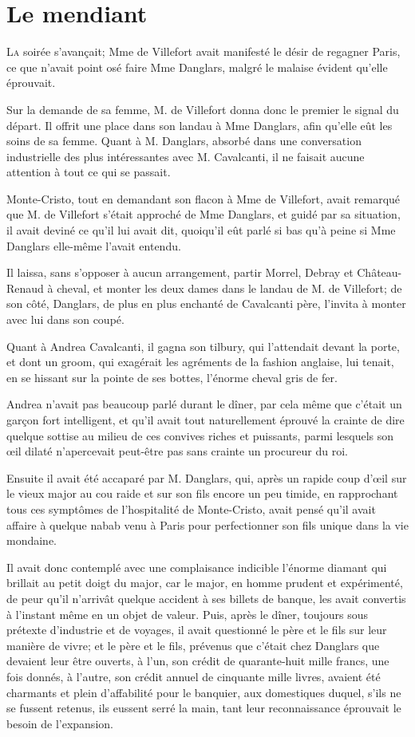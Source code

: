 \chapter{Le mendiant}

\lettrine{L}{a} soirée s'avançait; Mme de Villefort avait manifesté le désir de regagner Paris, ce que n'avait point osé faire Mme Danglars, malgré le malaise évident qu'elle éprouvait. 

\zz
Sur la demande de sa femme, M. de Villefort donna donc le premier le signal du départ. Il offrit une place dans son landau à Mme Danglars, afin qu'elle eût les soins de sa femme. Quant à M. Danglars, absorbé dans une conversation industrielle des plus intéressantes avec M. Cavalcanti, il ne faisait aucune attention à tout ce qui se passait. 

Monte-Cristo, tout en demandant son flacon à Mme de Villefort, avait remarqué que M. de Villefort s'était approché de Mme Danglars, et guidé par sa situation, il avait deviné ce qu'il lui avait dit, quoiqu'il eût parlé si bas qu'à peine si Mme Danglars elle-même l'avait entendu. 

Il laissa, sans s'opposer à aucun arrangement, partir Morrel, Debray et Château-Renaud à cheval, et monter les deux dames dans le landau de M. de Villefort; de son côté, Danglars, de plus en plus enchanté de Cavalcanti père, l'invita à monter avec lui dans son coupé. 

Quant à Andrea Cavalcanti, il gagna son tilbury, qui l'attendait devant la porte, et dont un groom, qui exagérait les agréments de la fashion anglaise, lui tenait, en se hissant sur la pointe de ses bottes, l'énorme cheval gris de fer. 

Andrea n'avait pas beaucoup parlé durant le dîner, par cela même que c'était un garçon fort intelligent, et qu'il avait tout naturellement éprouvé la crainte de dire quelque sottise au milieu de ces convives riches et puissants, parmi lesquels son œil dilaté n'apercevait peut-être pas sans crainte un procureur du roi. 

Ensuite il avait été accaparé par M. Danglars, qui, après un rapide coup d'œil sur le vieux major au cou raide et sur son fils encore un peu timide, en rapprochant tous ces symptômes de l'hospitalité de Monte-Cristo, avait pensé qu'il avait affaire à quelque nabab venu à Paris pour perfectionner son fils unique dans la vie mondaine. 

Il avait donc contemplé avec une complaisance indicible l'énorme diamant qui brillait au petit doigt du major, car le major, en homme prudent et expérimenté, de peur qu'il n'arrivât quelque accident à ses billets de banque, les avait convertis à l'instant même en un objet de valeur. Puis, après le dîner, toujours sous prétexte d'industrie et de voyages, il avait questionné le père et le fils sur leur manière de vivre; et le père et le fils, prévenus que c'était chez Danglars que devaient leur être ouverts, à l'un, son crédit de quarante-huit mille francs, une fois donnés, à l'autre, son crédit annuel de cinquante mille livres, avaient été charmants et plein d'affabilité pour le banquier, aux domestiques duquel, s'ils ne se fussent retenus, ils eussent serré la main, tant leur reconnaissance éprouvait le besoin de l'expansion. 

